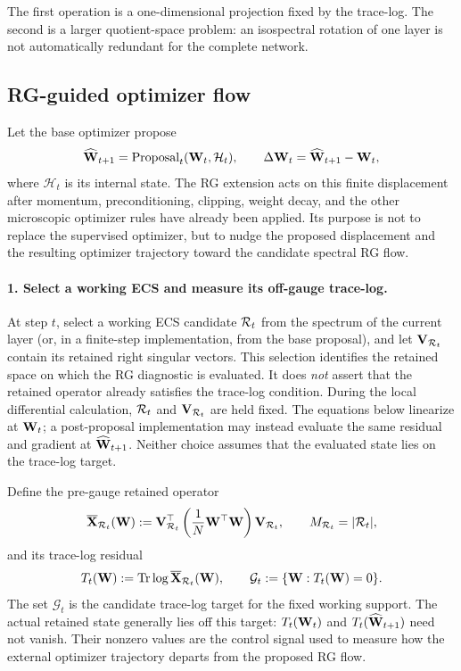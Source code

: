 The first operation is a one-dimensional projection fixed by the trace-log.  The second is a larger quotient-space problem: an isospectral rotation of one layer is not automatically redundant for the complete network.

\subsection{RG-guided optimizer flow}
\label{sxn:optimizer_general}

Let the base optimizer propose
\begin{equation}
  \widehat{\mathbf W}_{t+1}
  =
  \operatorname{Proposal}_t(\mathbf W_t,\mathcal H_t),
  \qquad
  \Delta\mathbf W_t=\widehat{\mathbf W}_{t+1}-\mathbf W_t,
  \label{eq:base_optimizer_proposal}
\end{equation}
where $\mathcal H_t$ is its internal state.  The RG extension acts on this finite displacement after momentum, preconditioning, clipping, weight decay, and the other microscopic optimizer rules have already been applied.  Its purpose is not to replace the supervised optimizer, but to nudge the proposed displacement and the resulting optimizer trajectory toward the candidate spectral RG flow.

\paragraph{1. Select a working ECS and measure its off-gauge trace-log.}
At step $t$, select a working ECS candidate $\mathcal R_t$ from the spectrum of the current layer (or, in a finite-step implementation, from the base proposal), and let $\mathbf V_{\mathcal R_t}$ contain its retained right singular vectors.  This selection identifies the retained space on which the RG diagnostic is evaluated.  It does \emph{not} assert that the retained operator already satisfies the trace-log condition.  During the local differential calculation, $\mathcal R_t$ and $\mathbf V_{\mathcal R_t}$ are held fixed.  The equations below linearize at $\mathbf W_t$; a post-proposal implementation may instead evaluate the same residual and gradient at $\widehat{\mathbf W}_{t+1}$.  Neither choice assumes that the evaluated state lies on the trace-log target.

Define the pre-gauge retained operator
\begin{equation}
  \overline{\mathbf X}_{\mathcal R_t}(\mathbf W)
  :=
  \mathbf V_{\mathcal R_t}^{\top}
  \left(\frac{1}{N}\mathbf W^{\top}\mathbf W\right)
  \mathbf V_{\mathcal R_t},
  \qquad
  M_{\mathcal R_t}=|\mathcal R_t|,
  \label{eq:optimizer_raw_retained_operator}
\end{equation}
and its trace-log residual
\begin{equation}
  T_t(\mathbf W)
  :=
  \operatorname{Tr}\log\overline{\mathbf X}_{\mathcal R_t}(\mathbf W),
  \qquad
  \mathcal G_t
  :=
  \{\mathbf W:T_t(\mathbf W)=0\}.
  \label{eq:optimizer_trace_log_coordinate}
\end{equation}
The set $\mathcal G_t$ is the candidate trace-log target for the fixed working support.  The actual retained state generally lies off this target:
$T_t(\mathbf W_t)$ and $T_t(\widehat{\mathbf W}_{t+1})$ need not vanish.  Their nonzero values are the control signal used to measure how the external optimizer trajectory departs from the proposed RG flow.

